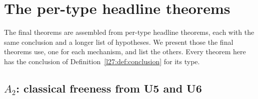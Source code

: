 \section{The per-type headline theorems}\label{l27:sec:ladders}

The final theorems are assembled from per-type headline theorems, each with the same conclusion and a longer list of hypotheses. We
present those the final theorems use, one for each mechanism, and list the others. Every theorem here has the conclusion of
Definition~\ref{l27:def:conclusion} for its type.

\subsection{\texorpdfstring{$A_2$}{A2}: classical freeness from U5 and U6}

